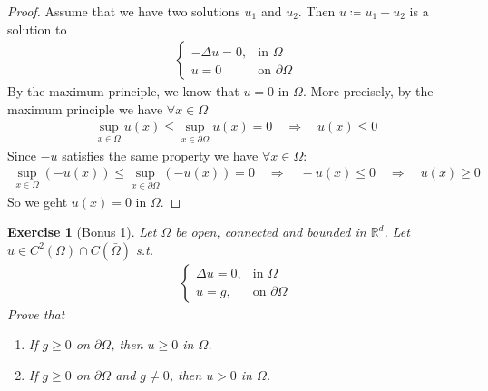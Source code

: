 \documentclass{report}
\theoremstyle{tommy}
\newtheorem{ex}[defn]{Exercise}
\begin{document}
\begin{proof}
  Assume that we have two solutions \(u_1\) and \(u_2\). Then \(u \coloneqq u_1 - u_2\) is a solution to 
  \begin{align*}
    \begin{cases}
      - \Delta u = 0, &\text{in } \Omega \\
      u = 0 &\text{on } \partial \Omega
    \end{cases}
  \end{align*}
  By the maximum principle, we know that \(u = 0\) in \(\Omega\). More precisely, by the maximum principle we have \(\forall x \in \Omega\)
  \begin{align*}
    \sup_{x \in \Omega} u(x) \le \sup_{x \in \partial \Omega} u(x) = 0
    \quad \Rightarrow \quad
    u(x) \le 0
  \end{align*}
  Since \(-u\) satisfies the same property we have \(\forall x \in \Omega\):
  \begin{align*}
    \sup_{x \in \Omega}(-u(x)) \le \sup_{x \in \partial \Omega} (-u(x)) = 0
    \quad \Rightarrow \quad
    - u(x) \le 0
    \quad \Rightarrow \quad
    u(x) \ge 0
  \end{align*}
  So we geht \(u(x)  = 0\) in \(\Omega\).
\end{proof}

\begin{ex}[Bonus 1]\label{bonus-1}
  Let \(\Omega\) be open, connected and bounded in \(\mathbb{R}^d\). Let \(u \in C^2(\Omega) \cap C(\bar \Omega)\) s.t. 
  \begin{align*}
    \begin{cases}
      \Delta u = 0, &\text{in } \Omega \\
      u = g, &\text{on } \partial \Omega
    \end{cases}
  \end{align*}
  Prove that \begin{enumerate}[label=\alph*)]
    \item If \(g \ge 0\) on \(\partial \Omega\), then \(u \ge 0\) in \(\Omega\). 
    \item If \(g \ge 0\) on \(\partial \Omega\) and \(g \ne 0\), then \(u > 0\) in \(\Omega\).
  \end{enumerate}
\end{ex}
\end{document}
